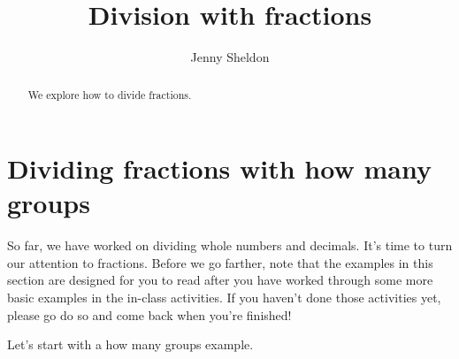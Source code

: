 \documentclass{ximera}
\title{Division with fractions}
\author{Jenny Sheldon}
\begin{document}
\begin{abstract}
We explore how to divide fractions.
\end{abstract}
\maketitle






\section{Dividing fractions with how many groups}

So far, we have worked on dividing whole numbers and decimals. It's time to turn our attention to fractions. Before we go farther, note that the examples in this section are designed for you to read after you have worked through some more basic examples in the in-class activities. If you haven't done those activities yet, please go do so and come back when you're finished! 

Let's start with a how many groups example. 
\end{document}
